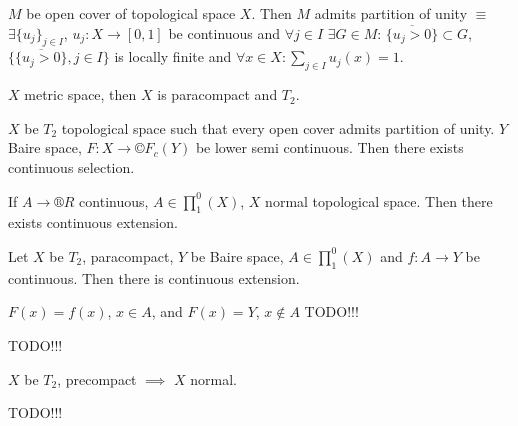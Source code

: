 \documentclass[12pt]{article}					%
\begin{document}
\begin{definice}
	$M$ be open cover of topological space $X$. Then $M$ admits partition of unity $≡$ $\exists \{u_j\}_{j \in I}$, $u_j: X \rightarrow [0, 1]$ be continuous and $\forall j \in I$ $\exists G \in M$: $\overline{\{u_j > 0\}} \subset G$, $\{\overline{\{u_j > 0\}}, j \in I\}$ is locally finite and $\forall x \in X: \sum_{j \in I} u_j(x) = 1$.
\end{definice}

\begin{poznamka}[Stone]
	$X$ metric space, then $X$ is paracompact and $T_2$.
\end{poznamka}

\begin{veta}
	$X$ be $T_2$ topological space such that every open cover admits partition of unity. $Y$ Baire space, $F: X \rightarrow ©F_c(Y)$ be lower semi continuous. Then there exists continuous selection.
\end{veta}

\begin{veta}[Tietze]
	If $A \rightarrow ®R$ continuous, $A \in ∏_1^0(X)$, $X$ normal topological space. Then there exists continuous extension.
\end{veta}

\begin{dusledek}
	Let $X$ be $T_2$, paracompact, $Y$ be Baire space, $A \in ∏_1^0(X)$ and $f: A \rightarrow Y$ be continuous. Then there is continuous extension.

	$F(x) = f(x)$, $x \in A$, and $F(x) = Y$, $x \notin A$ TODO!!!
\end{dusledek}

\begin{dusledek}
	TODO!!!
\end{dusledek}

\begin{dusledek}
	$X$ be $T_2$, precompact $\implies$ $X$ normal.
\end{dusledek}

\begin{dusledek}
	TODO!!!
\end{dusledek}

\end{document}
